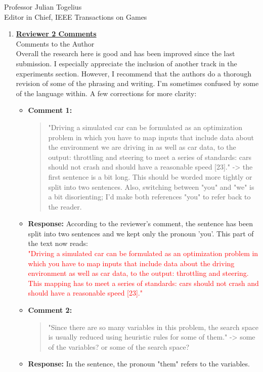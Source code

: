 \documentclass[10pt]{letter} %
\begin{document}
\begin{letter}{Professor Julian Togelius \\ Editor in Chief, IEEE Transactions on Games}
\begin{enumerate}
\item {\bf \underline{ Reviewer 2 Comments}}\\
	Comments to the Author\\
	Overall the research here is good and has been improved since the last submission. I especially appreciate the inclusion of another track in the experiments section.
	However, I recommend that the authors do a thorough revision of some of the phrasing and writing. I'm sometimes confused by some of the language within.
	A few corrections for more clarity:	
	\begin{itemize}			
		\item {\bf Comment 1:}
			\begin{quote}
				"Driving a simulated car can be formulated as an optimization problem in which you have to map inputs that include data about the environment we are driving in as well as car data, to the output: throttling and steering to meet a series of standards: cars should not crash and should have a reasonable speed [23]." -> the first sentence is a bit long. This should be worded more tightly or split into two sentences. Also, switching between "you" and "we" is a bit disorienting; I'd make both references "you" to refer back to the reader.
			\end{quote}	
		\item {\bf Response:} 
				According to the reviewer's comment, the sentence has been split into two sentences and we kept only the pronoun 'you'. This part of the text now reads: \\
			\textcolor{red}{
				"Driving a simulated car can be formulated as an optimization
				problem in which you have to map inputs that
				include data about the driving environment as well as car
				data, to the output: throttling and steering. This mapping
				has to meet a series of standards: cars should not crash
				and should have a reasonable speed [23]."}

		\item {\bf Comment 2:}
			\begin{quote}
				"Since there are so many variables in this problem, the search space is usually reduced using heuristic rules for some of them." -> some of the variables? or some of the search space?
			\end{quote}	
		\item {\bf Response:} 
		In the sentence, the pronoun "them" refers to the variables.
	

\end{itemize}
\end{enumerate}
\end{letter}
\end{document}

